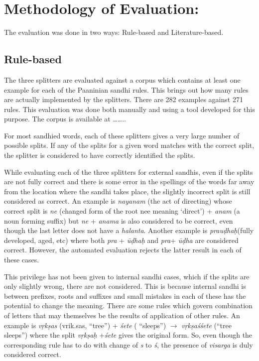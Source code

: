 \documentclass[11pt]{article}
\begin{document}
\section{Methodology of Evaluation:}
\label{sect:methodology}

The evaluation was done in two ways: Rule-based and Literature-based. 


\subsection{Rule-based}
The three splitters are evaluated against a corpus which contains at least one example for each of the Paaninian sandhi rules. This brings out how many rules are actually implemented by the splitters. There are 282 examples against 271 rules. This evaluation was done both manually and using a tool developed for this purpose. The corpus is available at ……..

For most sandhied words, each of these splitters gives a very large number of possible splits. If any of the splits for a given word matches with the correct split, the splitter is considered to have correctly identified the splits. 

While evaluating each of the three splitters for external sandhis, even if the splits are not fully correct and there is some error in the spellings of the words far away from the location where the sandhi takes place, the slightly incorrect split is still considered as correct. An example is \textit{nayanam} (the act of directing)  whose correct split is \textit{ne} (changed form of the root nee meaning ‘direct’) + \textit{anam} (a noun forming suffix)  but \textit{ne}  + \textit{anama} is also considered to be correct, even though the last letter does not have a \textit{halanta}.  Another example is \textit{prau\d{d}ha\d{h}}(fully developed, aged, etc) where both \textit{pra} + \textit{\={u}\d{d}ha\d{h}}  and \textit{pra}+ \textit{\={u}\d{d}ha} are considered correct.  However, the automated evaluation rejects the latter result in each of these cases.


This privilege has not been given to internal sandhi cases, which if the splits are only slightly wrong, there are not considered.  This is because internal sandhi is between prefixes, roots and suffixes and small mistakes in each of these has the potential to change the meaning.
There are some rules which govern combination of letters that may themselves be the results of application of other rules. An example is \textit{v\d{r}k\d{s}as }(vrik.sas, “tree”) + \textit{\'{s}ete} ( ``sleeps'') $\rightarrow$ \textit{v\d{r}k\d{s}a\'{s}\'{s}ete} (``tree sleeps'') where the split \textit{v\d{r}k\d{s}a\d{h} } +\textit{\'{s}ete}  gives the original form. So, even though the corresponding rule has to do with change of \textit{s} to\textit{ \'{s}}, the presence of \textit{visarga} is duly considered correct.
\end{document}
